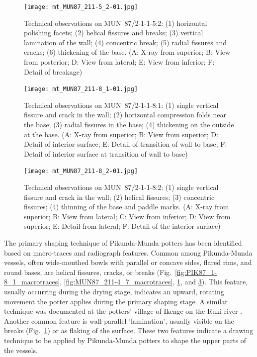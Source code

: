 \documentclass[smallextended,natbib]{svjour3}       %
\begin{document}
\begin{figure}[!tb]
	\texttt{[image: mt\_MUN87\_211-5\_2-01.jpg]}
	\caption{Technical observations on MUN~87/2-1-1-5:2: (1) horizontal polishing facets; (2) helical fissures and breaks; (3) vertical lamination of the wall; (4) concentric break; (5) radial fissures and cracks; (6) thickening of the base. (A: X-ray from superior; B: View from posterior; D: View from lateral; E: View from inferior; F: Detail of breakage)}
	\label{fig:MUN87_211-5_2_macrotraces}
\end{figure}

\begin{figure}[p]
	\centering
	\texttt{[image: mt\_MUN87\_211-8\_1-01.jpg]}
	\caption{Technical observations on MUN~87/2-1-1-8:1: (1) single vertical fissure and crack in the wall; (2) horizontal compression folds near the base; (3) radial fissures in the base; (4) thickening on the outside at the base. (A: X-ray from superior; B: View from superior; D: Detail of interior surface; E: Detail of transition of wall to base; F: Detail of interior surface at transition of wall to base)}
	\label{fig:MUN87_211-8_1_macrotraces}
\end{figure}

\begin{figure}[p]
	\centering
	\texttt{[image: mt\_MUN87\_211-8\_2-01.jpg]}
	\caption{Technical observations on MUN~87/2-1-1-8:2: (1) single vertical fissure and crack in the wall; (2) helical fissures; (3) concentric fissures; (4) thinning of the base and paddle marks. (A: X-ray from superior; B: View from lateral; C: View from inferior; D: View from superior; E: Detail from lateral; F: Detail of the interior surface)}
	\label{fig:MUN87_211-8_2_macrotraces}
\end{figure}

The primary shaping technique of Pikunda-Munda potters has been identified based on macro-traces and radiograph features. Common among Pikunda-Munda vessels, often wide-mouthed bowls with parallel or concave sides, flared rims, and round bases, are helical fissures, cracks, or breaks (Fig.~\ref{fig:PIK87_1-8_1_macrotraces}, \ref{fig:MUN87_211-4_7_macrotraces}, \ref{fig:MUN87_211-5_2_macrotraces}, and \ref{fig:MUN87_211-8_2_macrotraces}). This feature, usually occurring during the drying stage, indicates an upward, rotating movement the potter applies during the primary shaping stage. A similar technique was documented at the potters' village of Ikenge on the Ruki river \citep[Fig.~\ref{fig:map}; ][]{Eggert.1980c}. Another common feature is wall-parallel 'lamination', usually visible on the breaks (Fig.~\ref{fig:MUN87_211-5_2_macrotraces}) or as flaking of the surface. These two features indicate a drawing technique to be applied by Pikunda-Munda potters to shape the upper parts of the vessels.
\end{document}
